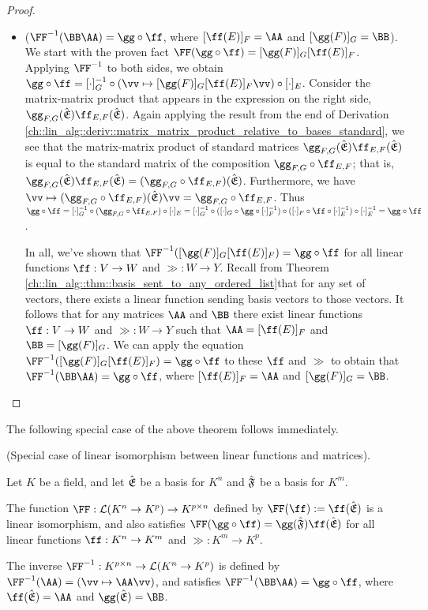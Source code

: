 \begin{proof}
\begin{itemize}
        \item ($\FF^{-1}(\BB \AA) = \gg \circ \ff$, where $[\ff(E)]_F = \AA$ and $[\gg(F)]_G = \BB$). We start with the proven fact ${\FF(\gg \circ \ff) = [\gg(F)]_G [\ff(E)]_F}$. Applying $\FF^{-1}$ to both sides, we obtain ${\gg \circ \ff = [\cdot]_G^{-1} \circ (\vv \mapsto [\gg(F)]_G [\ff(E)]_F \vv) \circ [\cdot]_E}$. Consider the matrix-matrix product that appears in the expression on the right side, $\gg_{F,G}(\sE) \ff_{E,F}(\sE)$. Again applying the result from the end of Derivation \ref{ch::lin_alg::deriv::matrix_matrix_product_relative_to_bases_standard}, we see that the matrix-matrix product of standard matrices $\gg_{F,G}(\sE) \ff_{E,F}(\sE)$ is equal to the standard matrix of the composition $\gg_{F,G} \circ \ff_{E,F}$; that is, \\ ${\gg_{F,G}(\sE) \ff_{E,F}(\sE) = (\gg_{F,G} \circ \ff_{E,F})(\sE)}$. Furthermore, we have
        ${\vv \mapsto (\gg_{F,G} \circ \ff_{E,F})(\sE) \vv = \gg_{F,G} \circ \ff_{E,F}}$. Thus $\gg \circ \ff = [\cdot]_G^{-1} \circ (\gg_{F,G} \circ \ff_{E,F}) \circ [\cdot]_E = [\cdot]_G^{-1} \circ ([\cdot]_G \circ \gg \circ [\cdot]_F^{-1}) \circ ([\cdot]_F \circ \ff \circ [\cdot]_E^{-1}) \circ [\cdot]_E^{-1} = \gg \circ \ff$.
        
        In all, we've shown that $\FF^{-1}([\gg(F)]_G [\ff(E)]_F) = \gg \circ \ff$ for all linear functions $\ff:V \rightarrow W$ and $\gg:W \rightarrow Y$. Recall from Theorem \ref{ch::lin_alg::thm::basis_sent_to_any_ordered_list}that for any set of vectors, there exists a linear function sending basis vectors to those vectors. It follows that for any matrices $\AA$ and $\BB$ there exist linear functions $\ff:V \rightarrow W$ and $\gg:W \rightarrow Y$ such that $\AA = [\ff(E)]_F$ and $\BB = [\gg(F)]_G$. We can apply the equation $\FF^{-1}([\gg(F)]_G [\ff(E)]_F) = \gg \circ \ff$ to these $\ff$ and $\gg$ to obtain that $\FF^{-1}(\BB \AA) = \gg \circ \ff$, where $[\ff(E)]_F = \AA$ and $[\gg(F)]_G = \BB$.
    \end{itemize}
\end{proof}

The following special case of the above theorem follows immediately.

\begin{theorem}
    \label{ch::lin_alg::thm::linear_functions_matrices_isomorphism_special_case}

    (Special case of linear isomorphism between linear functions and matrices).
    
    Let $K$ be a field, and let ${\hat{\mathfrak{E}}}$ be a basis for $K^n$ and ${\hat{\mathfrak{F}}}$ be a basis for $K^m$.
    
    The function $\FF:\LLLL(K^n \rightarrow K^p) \rightarrow K^{p \times n}$ defined by $\FF(\ff) := \ff(\sE)$ is a linear isomorphism, and also satisfies $\FF(\gg \circ \ff) = \gg(\sF) \ff(\sE)$ for all linear functions $\ff:K^n \rightarrow K^m$ and $\gg:K^m \rightarrow K^p$.

    The inverse $\FF^{-1}:K^{p \times n} \rightarrow \LLLL(K^n \rightarrow K^p)$ is defined by $\FF^{-1}(\AA) = (\vv \mapsto \AA \vv)$, and satisfies $\FF^{-1}(\BB \AA) = \gg \circ \ff$, where $\ff(\sE) = \AA$ and $\gg(\sE) = \BB$.
\end{theorem}

